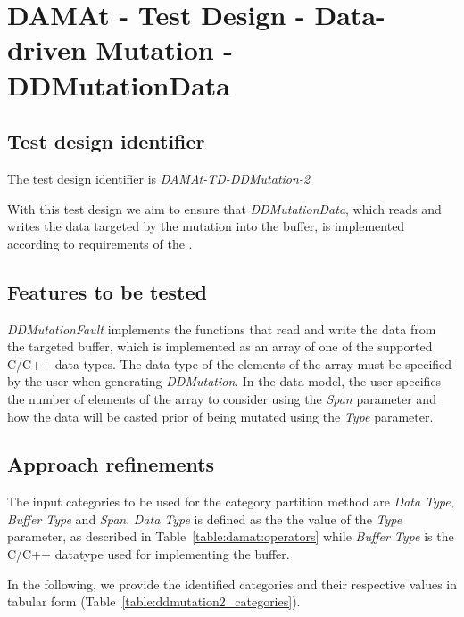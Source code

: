 \section{DAMAt - Test Design - Data-driven Mutation - DDMutationData}

\subsection{Test design identifier}
%
The test design identifier is \emph{DAMAt-TD-DDMutation-2}

With this test design we aim to ensure that \emph{DDMutationData}, which reads and writes the data targeted by the mutation into the buffer, is implemented according to requirements of the \FAQAS.
%
\subsection{Features to be tested}

\emph{DDMutationFault} implements the functions that read and write the data from the targeted buffer, which is implemented as an array of one of the supported C/C++ data types.
The data type of the elements of the array must be specified by the user when generating \emph{DDMutation}.
In the data model, the user specifies the number of elements of the array to consider using the \emph{Span} parameter and how the data will be casted prior of being mutated using the \emph{Type} parameter.


\subsection{Approach refinements}
%
The input categories to be used for the category partition method are \emph{Data Type}, \emph{Buffer Type} and \emph{Span}.
\emph{Data Type} is defined as the the value of the \emph{Type} parameter, as described in Table~\ref{table:damat:operators} while \emph{Buffer Type} is the C/C++ datatype used for implementing the buffer.

In the following, we provide the identified categories and their respective values in tabular form (Table~\ref{table:ddmutation2_categories}).

